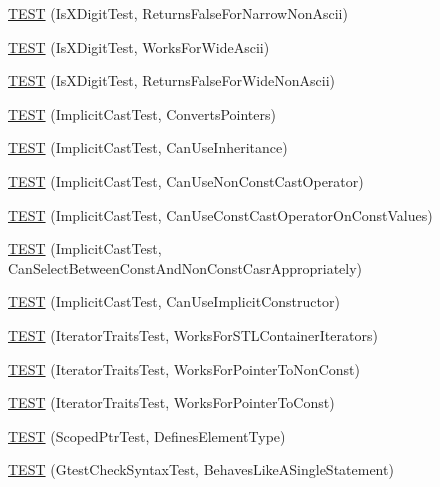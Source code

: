 \begin{DoxyCompactItemize}
\hyperlink{namespacetesting_1_1internal_a7cd9d67d4164d2aeb4ceb3ed253c7d2d}{T\-E\-S\-T} (Is\-X\-Digit\-Test, Returns\-False\-For\-Narrow\-Non\-Ascii)
\item 
\hyperlink{namespacetesting_1_1internal_af76bca685fddffc0ecda1464b1b6a0a4}{T\-E\-S\-T} (Is\-X\-Digit\-Test, Works\-For\-Wide\-Ascii)
\item 
\hyperlink{namespacetesting_1_1internal_a771232ed3801fa49cbd4bbe11b318fe3}{T\-E\-S\-T} (Is\-X\-Digit\-Test, Returns\-False\-For\-Wide\-Non\-Ascii)
\item 
\hyperlink{namespacetesting_1_1internal_a5d2ec1128c80363b06070f403f682490}{T\-E\-S\-T} (Implicit\-Cast\-Test, Converts\-Pointers)
\item 
\hyperlink{namespacetesting_1_1internal_a1b304dcd3ac71095f2e7d9e9b43c4755}{T\-E\-S\-T} (Implicit\-Cast\-Test, Can\-Use\-Inheritance)
\item 
\hyperlink{namespacetesting_1_1internal_a8554484c7c0ea536bc393c254490aaff}{T\-E\-S\-T} (Implicit\-Cast\-Test, Can\-Use\-Non\-Const\-Cast\-Operator)
\item 
\hyperlink{namespacetesting_1_1internal_af7f631f9fbde27b19a65d50fc29e1420}{T\-E\-S\-T} (Implicit\-Cast\-Test, Can\-Use\-Const\-Cast\-Operator\-On\-Const\-Values)
\item 
\hyperlink{namespacetesting_1_1internal_a62a3b62658f9d47733cb7b5c8f69b2ad}{T\-E\-S\-T} (Implicit\-Cast\-Test, Can\-Select\-Between\-Const\-And\-Non\-Const\-Casr\-Appropriately)
\item 
\hyperlink{namespacetesting_1_1internal_ad5c2cf37cc5aa78744012255cae78f9b}{T\-E\-S\-T} (Implicit\-Cast\-Test, Can\-Use\-Implicit\-Constructor)
\item 
\hyperlink{namespacetesting_1_1internal_abd56ca990c5b8c1aea44d15028a74f33}{T\-E\-S\-T} (Iterator\-Traits\-Test, Works\-For\-S\-T\-L\-Container\-Iterators)
\item 
\hyperlink{namespacetesting_1_1internal_a642234d85836450bb8795cf0a8a9f908}{T\-E\-S\-T} (Iterator\-Traits\-Test, Works\-For\-Pointer\-To\-Non\-Const)
\item 
\hyperlink{namespacetesting_1_1internal_afc0e95a0472d243967fd4720c681c478}{T\-E\-S\-T} (Iterator\-Traits\-Test, Works\-For\-Pointer\-To\-Const)
\item 
\hyperlink{namespacetesting_1_1internal_a99f56e2e9d5b30a879f877cc72bb0c0c}{T\-E\-S\-T} (Scoped\-Ptr\-Test, Defines\-Element\-Type)
\item 
\hyperlink{namespacetesting_1_1internal_a26d00130a017a66d0d60dc5a02a13d25}{T\-E\-S\-T} (Gtest\-Check\-Syntax\-Test, Behaves\-Like\-A\-Single\-Statement)

\end{DoxyCompactItemize}
